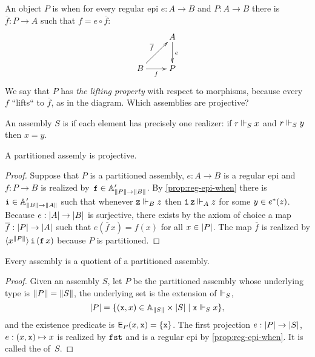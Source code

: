 An object $P$ is  when for every regular epi $e : A \to B$ and $P : A \to B$ there is $\overline{f} : P \to A$ such that $f = e \circ \overline{f}$:
%
\begin{equation*}
  \xymatrix{
    &
    {A}
    \ar[d]^{e}
    \\
    {B}
    \ar[r]_{f}
    \ar[ru]^{\overline{f}}
    &
    {P}
  }
\end{equation*}
%
We say that $P$ has \emph{the lifting property} with respect to morphisms, because every~$f$ ``lifts`` to $\overline{f}$, as in the diagram.  Which assemblies are projective?

\begin{definition}
  An assembly $S$ is  if each element has precisely one realizer:
  if $r \rz[S] x$ and $r \rz[S] y$ then $x = y$.
\end{definition}

\begin{proposition}
  \label{prop:partitioned-projective}
  A partitioned assemly is projective.
\end{proposition}

\begin{proof}
  Suppose that $P$ is a partitioned assembly, $e : A \to B$ is a regular epi and $f : P \to B$ is realized by~$\R{f} \in \subAtyp{\T{P} \to \T{B}}$.
  By \cref{prop:reg-epi-when} there is $\R{i} \in \subAtyp{\T{B} \to \T{A}}$ such that whenever $\R{z} \rz[B] z$ then $\R{i}\,\R{z} \rz[A] z$ for some $y \in \invim{e}(z)$.
  Because $e : \S{A} \to \S{B}$ is surjective, there exists by the axiom of choice a map $\overline{f} : \S{P} \to \S{A}$ such that $e(\overline{f}\, x) = f(x)$ for all $x \in \S{P}$. The map $\overline{f}$ is realized by $\tpcalam{x}{\T{P}} \R{i}\,(\R{f}\,x)$ because $P$ is partitioned.
\end{proof}

\begin{proposition}
  \label{prop:partitioned-covers}
  Every assembly is a quotient of a partitioned assembly.
\end{proposition}

\begin{proof}
  Given an assembly $S$, let $P$ be the partitioned assembly whose underlying type is $\T{P} = \T{S}$, the underlying set is the extension of $\rz[S]$,
  \begin{equation*}
    \S{P} = \set{ (\R{x}, x) \in \Atyp{\T{S}} \times \S{S} \such \R{x} \rz[S] x},
  \end{equation*}
  and the existence predicate is $\Ex_P(x, \R{x}) = \set{\R{x}}$.
  The first projection $e : \S{P} \to \S{S}$, $e : (x, \R{x}) \mapsto x$ is realized by $\combFst$ and is a regular epi by \cref{prop:reg-epi-when}.
  It is called the  of~$S$.
\end{proof}


